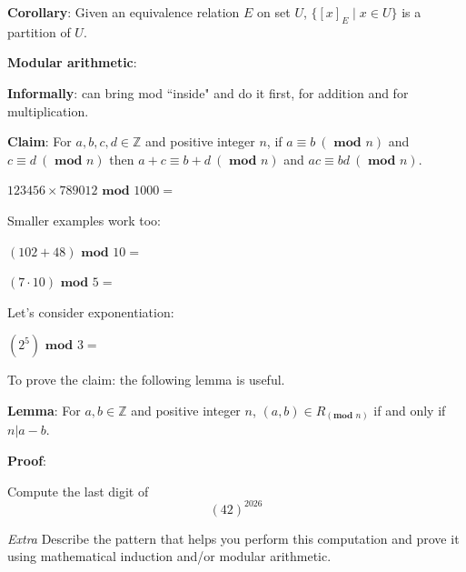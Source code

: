\documentclass[12pt, oneside]{article}
\begin{document}
\vfill

{\bf Corollary}: Given an equivalence relation $E$ on set $U$,  
$\{ [x]_{E} \mid x \in U  \}$ is a partition of $U$.
\vfill 
\newpage


{\bf Modular arithmetic}: 


{\bf Informally}: can bring mod ``inside" and do it first, for addition and for multiplication.

{\bf Claim}: For $a, b, c, d \in \mathbb{Z}$ 
and positive integer $n$, if $a \equiv b ~(\textbf{ mod } n)$ and $c \equiv d ~(\textbf{ mod } n)$ 
then $a+c \equiv b+d ~(\textbf{ mod } n)$ and $ac \equiv bd ~(\textbf{ mod } n)$.

$123456 \times 789012 \textbf{ mod } 1000 = $

\vfill

Smaller examples work too: 

$(102 + 48) \textbf{ mod } 10 = $ 

$(7 \cdot 10) \textbf{ mod } 5 =$

Let's consider exponentiation: 

$(2^5) \textbf{ mod } 3 = $ 

\vfill

To prove the claim: the following lemma is useful. 

{\bf Lemma}: For $a, b \in \mathbb{Z}$ 
and positive integer $n$, $(a,b) \in R_{(\textbf{mod } n)}$ if and only if  $n | a-b$.

{\bf Proof}: 

\phantom{Consider arbitrary integers $a,b$ and arbitrary positive integer $n$.}



\vspace{200pt} \vfill
\newpage



Compute the last digit of 
\[
    (42)^{2026}
\]

\vfill

{\it Extra} Describe the pattern that helps you perform this computation 
and prove it using mathematical induction and/or modular arithmetic. 
\end{document}
